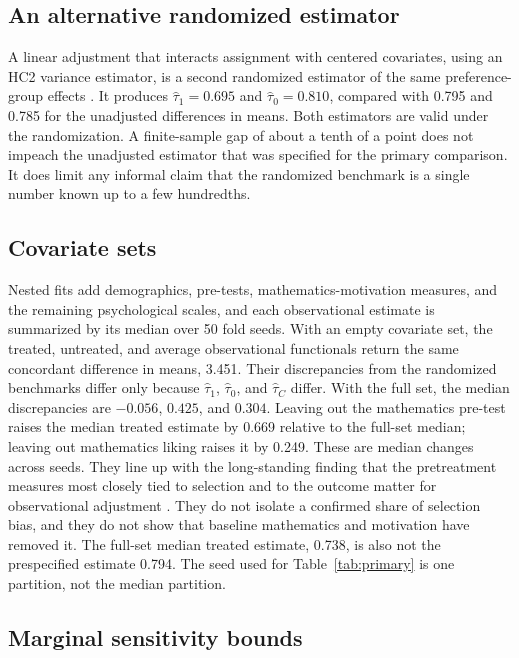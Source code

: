 \documentclass[11pt]{article}
\theoremstyle{remark}
\begin{document}
\subsection{An alternative randomized estimator}

A linear adjustment that interacts assignment with centered covariates, using an HC2 variance estimator, is a second randomized estimator of the same preference-group effects \citep{lin2013}. It produces $\widehat\tau_1=0.695$ and $\widehat\tau_0=0.810$, compared with 0.795 and 0.785 for the unadjusted differences in means. Both estimators are valid under the randomization. A finite-sample gap of about a tenth of a point does not impeach the unadjusted estimator that was specified for the primary comparison. It does limit any informal claim that the randomized benchmark is a single number known up to a few hundredths.

\subsection{Covariate sets}

Nested fits add demographics, pre-tests, mathematics-motivation measures, and the remaining psychological scales, and each observational estimate is summarized by its median over 50 fold seeds. With an empty covariate set, the treated, untreated, and average observational functionals return the same concordant difference in means, 3.451. Their discrepancies from the randomized benchmarks differ only because $\widehat\tau_1$, $\widehat\tau_0$, and $\widehat\tau_C$ differ. With the full set, the median discrepancies are $-0.056$, $0.425$, and $0.304$. Leaving out the mathematics pre-test raises the median treated estimate by 0.669 relative to the full-set median; leaving out mathematics liking raises it by 0.249. These are median changes across seeds. They line up with the long-standing finding that the pretreatment measures most closely tied to selection and to the outcome matter for observational adjustment \citep{steiner2010}. They do not isolate a confirmed share of selection bias, and they do not show that baseline mathematics and motivation have removed it. The full-set median treated estimate, 0.738, is also not the prespecified estimate 0.794. The seed used for Table~\ref{tab:primary} is one partition, not the median partition.

\subsection{Marginal sensitivity bounds}
\end{document}
